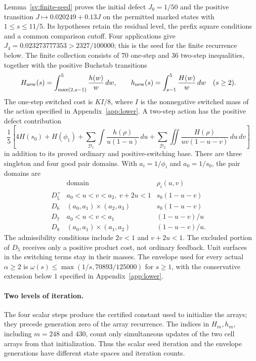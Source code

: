 Lemma~\ref{sv:finite-seed} proves the initial defect $J_0=1/50$
and the positive transition
$J\mapsto0.020249+0.13J$ on the permitted marked states with
$1\le s\le11/5$. Its hypotheses retain the residual level, the
prefix square conditions and a common comparison cutoff. Four
applications give $J_4=0.023273777353>2327/100000$; this is the seed
for the finite recurrence below.
The finite collection consists of $70$ one-step and $36$ two-step
inequalities, together with the positive Buchstab transitions
\[
 H_{\rm new}(s)=\int_{\max(2,s-1)}^5\frac{h(w)}w\,dw,
 \qquad
 h_{\rm new}(s)=\int_{s-1}^5\frac{H(w)}w\,dw\quad(s\ge2).
\]
The one-step switched cost is $KI/8$, where $I$ is the
nonnegative switched mass of the action specified in
Appendix~\ref{app:lower}.  A two-step action has the
positive defect contribution
\begin{equation}
 \frac15\left[4H(s_0)+H(\phi_1)
  +\sum_{\mathcal D_1}\int\frac{h(\rho)}{u(1-u)}\,du
  +\sum_{\mathcal D_2}\iint\frac{H(\rho)}{uv(1-u-v)}\,du\,dv\right]
 \label{eq:current-w2-feedback}
\end{equation}
in addition to its proved ordinary and positive-switching base.
There are three singleton and four good pair domains.  With
$a_i=1/\phi_i$ and $a_0=1/s_0$, the pair domains are
\[
 \begin{array}{c|c|c}
 &\text{domain}&\rho_i(u,v)\\ \hline
 D_5^+&a_0<u<v<a_2,\ v+2u<1&s_0(1-u-v)\\
 D_6&(a_0,a_1)\mathbin{\times}(a_2,a_3)&s_0(1-u-v)\\
 D_7&a_0<u<v<a_1&(1-u-v)/u\\
 D_8&(a_0,a_1)\mathbin{\times}(a_1,a_2)&(1-u-v)/u.
 \end{array}
\]
The admissibility conditions include $2v<1$ and $v+2u<1$.
The excluded portion of $D_5$ receives only a positive product cost,
not ordinary feedback.  Unit surfaces in the switching terms stay
in their masses.  The envelope used for every actual $\alpha\ge2$ is
$\omega(s)\le\max(1/s,70893/125000)$ for $s\ge1$, with the
conservative extension below $1$ specified in Appendix~\ref{app:lower}.

\paragraph{Two levels of iteration.}
The four scalar steps produce the certified constant used to initialize
the arrays; they precede generation zero of the array recurrence.
The indices in $H_m,h_m$, including $m=248$ and $430$, count only
simultaneous updates of the two cell arrays from that initialization.
Thus the scalar seed iteration and the envelope generations have
different state spaces and iteration counts.

